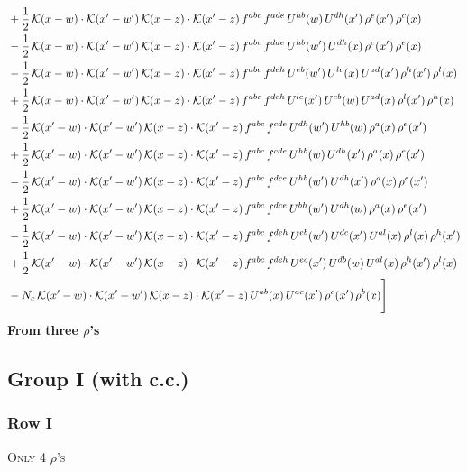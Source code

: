 \documentclass[9pt]{article}
\numberwithin{equation}{section}
\begin{document}
\begin{align}
& +\frac{1}{2}\,\mathcal{K}(x-w)\cdot\mathcal{K}(x'-w')\,\mathcal{K}(x-z)\cdot\mathcal{K}(x'-z)\,f^{abc}\,f^{ade}\,U^{hb}(w)\,U^{dh}(x')\,\rho^{e}(x')\,\rho^{c}(x)\notag\\
& -\frac{1}{2}\,\mathcal{K}(x-w)\cdot\mathcal{K}(x'-w')\,\mathcal{K}(x-z)\cdot\mathcal{K}(x'-z)\,f^{abc}\,f^{dae}\,U^{hb}(w')\,U^{dh}(x)\,\rho^{c}(x')\,\rho^{e}(x)\notag\\
& -\frac{1}{2}\,\mathcal{K}(x-w)\cdot\mathcal{K}(x'-w')\,\mathcal{K}(x-z)\cdot\mathcal{K}(x'-z)\,f^{abc}\,f^{deh}\,U^{eb}(w')\,U^{lc}(x)\,U^{ad}(x')\,\rho^{h}(x')\,\rho^{l}(x)\notag\\
& +\frac{1}{2}\,\mathcal{K}(x-w)\cdot\mathcal{K}(x'-w')\,\mathcal{K}(x-z)\cdot\mathcal{K}(x'-z)\,f^{abc}\,f^{deh}\,U^{lc}(x')\,U^{eb}(w)\,U^{ad}(x)\,\rho^{l}(x')\,\rho^{h}(x)\notag\\
& -\frac{1}{2}\,\mathcal{K}(x'-w)\cdot\mathcal{K}(x'-w')\,\mathcal{K}(x-z)\cdot\mathcal{K}(x'-z)\,f^{abc}\,f^{cde}\,U^{dh}(w')\,U^{hb}(w)\,\rho^{a}(x)\,\rho^{e}(x')\notag\\
& +\frac{1}{2}\,\mathcal{K}(x'-w)\cdot\mathcal{K}(x'-w')\,\mathcal{K}(x-z)\cdot\mathcal{K}(x'-z)\,f^{abc}\,f^{cde}\,U^{hb}(w)\,U^{dh}(x')\,\rho^{a}(x)\,\rho^{e}(x')\notag\\
& -\frac{1}{2}\,\mathcal{K}(x'-w)\cdot\mathcal{K}(x'-w')\,\mathcal{K}(x-z)\cdot\mathcal{K}(x'-z)\,f^{abc}\,f^{dce}\,U^{hb}(w')\,U^{dh}(x')\,\rho^{a}(x)\,\rho^{e}(x')\notag\\
& +\frac{1}{2}\,\mathcal{K}(x'-w)\cdot\mathcal{K}(x'-w')\,\mathcal{K}(x-z)\cdot\mathcal{K}(x'-z)\,f^{abc}\,f^{dce}\,U^{bh}(w')\,U^{dh}(w)\,\rho^{a}(x)\,\rho^{e}(x')\notag\\
& -\frac{1}{2}\,\mathcal{K}(x'-w)\cdot\mathcal{K}(x'-w')\,\mathcal{K}(x-z)\cdot\mathcal{K}(x'-z)\,f^{abc}\,f^{deh}\,U^{eb}(w')\,U^{dc}(x')\,U^{al}(x)\,\rho^{l}(x)\,\rho^{h}(x')\notag\\
& +\frac{1}{2}\,\mathcal{K}(x'-w)\cdot\mathcal{K}(x'-w')\,\mathcal{K}(x-z)\cdot\mathcal{K}(x'-z)\,f^{abc}\,f^{deh}\,U^{ec}(x')\,U^{db}(w)\,U^{al}(x)\,\rho^{h}(x')\,\rho^{l}(x)\notag\\
& -N_{c}\,\mathcal{K}(x'-w)\cdot\mathcal{K}(x'-w')\,\mathcal{K}(x-z)\cdot\mathcal{K}(x'-z)\,U^{ab}(x)\,U^{ac}(x')\,\rho^{c}(x')\,\rho^{b}(x)\Bigg]
\end{align}
\textbf{From three $\rho$'s}
\subsection{Group I (with c.c.)}
\subsubsection{Row I}
\textsc{Only 4 $\rho$'s}
\end{document}
